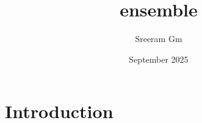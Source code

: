 \documentclass{article}
\title{ensemble}
\author{Sreeram Gm}
\date{September 2025}
\begin{document}
\maketitle

\section{Introduction}
\end{document}
